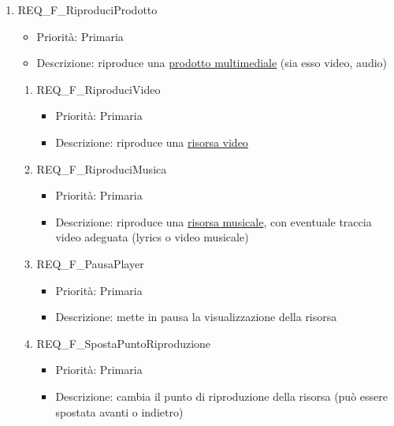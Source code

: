 \begin{enumerate}
	\item REQ\_F\_RiproduciProdotto
		\begin{itemize}
		\item Priorità: Primaria	
		\item Descrizione: riproduce una \hyperlink{AnReqProdMult}{prodotto multimediale} (sia esso video, audio)
		\end{itemize}
    		\begin{enumerate}[label*=\arabic*.]      				
		\item REQ\_F\_RiproduciVideo
			\begin{itemize}
			\item Priorità: Primaria
			\item Descrizione: riproduce una \hyperlink{AnReqVideo}{risorsa video}
			\end{itemize}
		\item REQ\_F\_RiproduciMusica
			\begin{itemize}
			\item Priorità: Primaria
			\item Descrizione: riproduce una \hyperlink{AnReqMusicali}{risorsa musicale}, con eventuale traccia video adeguata (lyrics o video musicale)
			\end{itemize}
			
		\item REQ\_F\_PausaPlayer
			\begin{itemize}
			\item Priorità: Primaria
			\item Descrizione: mette in pausa la visualizzazione della risorsa
			\end{itemize}
			
		\item REQ\_F\_SpostaPuntoRiproduzione
			\begin{itemize}
			\item Priorità: Primaria
			\item Descrizione: cambia il punto di riproduzione della risorsa (può essere spostata avanti o indietro)
			\end{itemize}		
		\end{enumerate}
		

\end{enumerate}
